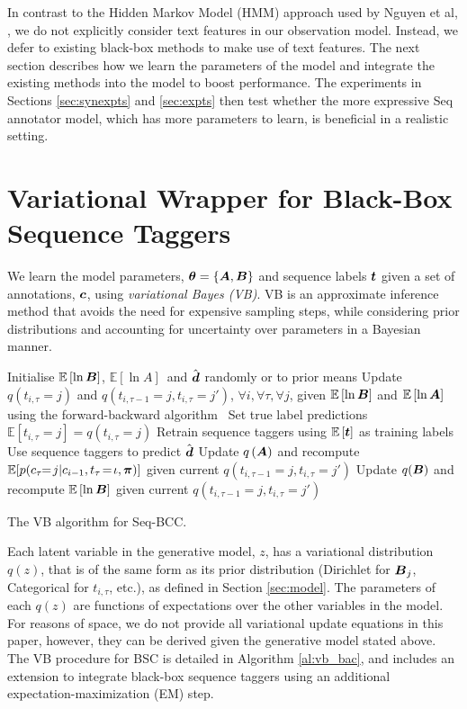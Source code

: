 In contrast to the Hidden Markov Model (HMM) approach used by Nguyen et al, ,
we do not explicitly consider text features in our observation model. Instead,
we defer to existing black-box methods to make use of text features. 
The next section describes how we learn the parameters of the model and
integrate the existing methods into the model to boost performance.
The experiments in Sections \ref{sec:synexpts} and \ref{sec:expts} then test whether the more expressive Seq annotator model,
which has more parameters to learn, is beneficial in a realistic setting.

\section{Variational Wrapper for Black-Box Sequence Taggers} \label{sec:vb}
 
We learn the model parameters, $\boldsymbol\theta=\{\boldsymbol A, \boldsymbol B\}$ and sequence labels $\boldsymbol t$
given a set of annotations, $\boldsymbol c$, using \emph{variational Bayes (VB)}\cite{attias_advances_2000}.
VB is an approximate inference method that avoids the need for expensive sampling steps,
while considering prior distributions and accounting for uncertainty over parameters in a Bayesian manner.
\begin{algorithm}
 \nl Initialise $\mathbb{E}\left[\ln \boldsymbol B \right]$,
 $\mathbb{E}\left[\ln A \right]$\, and 
 $\hat{\boldsymbol d}$ randomly or to prior means\;
 {
 \nl Update $q(t_{i,\tau}=j)$ and $q(t_{i,\tau-1}=j, t_{i,\tau}=j')$, $\forall i,\forall \tau,\forall j$,
 given $\mathbb{E}\left[\ln \boldsymbol B \right]$ and 
 $\mathbb{E}\left[\ln\boldsymbol A \right]$
 using the forward-backward algorithm~\cite{ghahramani2001introduction}\;
 \nl Set true label predictions $\mathbb{E}\left[t_{i,\tau}=j\right] = q(t_{i,\tau}=j)$ \;
 \nl Retrain sequence taggers using $\mathbb{E}\left[\boldsymbol t\right]$ as training labels\;
 \nl Use sequence taggers to predict $\hat{\boldsymbol d}$\;
 \nl Update $q\left(\boldsymbol A\right)$ and recompute $\mathbb{E}[p( c_{\tau} \!\!=\! j | c_{i-1}, t_{\tau} \!=\! \iota, \boldsymbol\pi )]$ given current $q(t_{i,\tau-1}=j, t_{i,\tau}=j')$\;
 \nl Update $q(\boldsymbol B)$ and recompute $\mathbb{E}\left[\ln\boldsymbol B \right]$ given current $q(t_{i,\tau-1}=j, t_{i,\tau}=j')$\;
 }
\caption{The VB algorithm for Seq-BCC.}
\label{al:vb_bac}
\end{algorithm}
Each latent variable in the generative model, $z$, has a variational distribution $q(z)$,
that is of the same form as its prior distribution (Dirichlet for $\boldsymbol B_j$, Categorical for $t_{i,\tau}$, etc.),
as defined in Section \ref{sec:model}.
The parameters of each $q(z)$ are functions of expectations over the other variables in the model.
For reasons of space, we do not provide all variational update equations in this paper, 
however, they can be derived given the generative model stated above.
The VB procedure for BSC is detailed in Algorithm \ref{al:vb_bac}, 
and includes an extension to integrate black-box sequence taggers using  
an additional expectation-maximization (EM) step.

